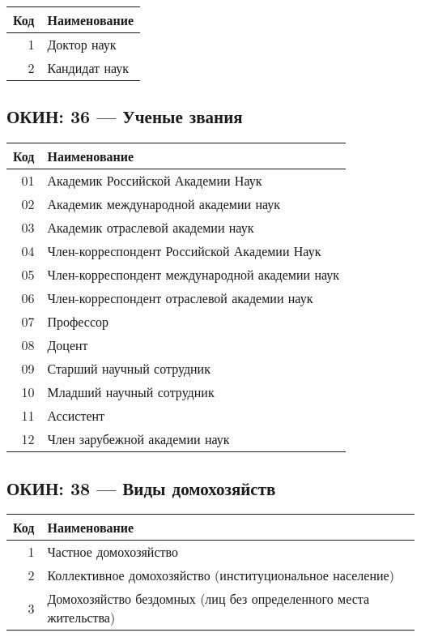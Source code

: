 \documentclass[10pt, a4paper, titlepage]{article}
\begin{document}
\begin{center}
    \begin{tabular}{rp{}}
        \hline
        \textbf{Код} & \textbf{Наименование} \\ \hline
        1 & Доктор наук \\
        2 & Кандидат наук \\
    \end{tabular}
\end{center}

\subsection{ОКИН: 36 --- Ученые звания}

\begin{center}
    \begin{tabular}{rp{}}
        \hline
        \textbf{Код} & \textbf{Наименование} \\ \hline
        01 & Академик Российской Академии Наук \\
        02 & Академик международной академии наук \\
        03 & Академик отраслевой академии наук \\
        04 & Член-корреспондент Российской Академии Наук \\
        05 & Член-корреспондент международной академии наук \\
        06 & Член-корреспондент отраслевой академии наук \\
        07 & Профессор \\
        08 & Доцент \\
        09 & Старший научный сотрудник \\
        10 & Младший научный сотрудник \\
        11 & Ассистент \\
        12 & Член зарубежной академии наук \\
    \end{tabular}
\end{center}

\subsection{ОКИН: 38 --- Виды домохозяйств}

\begin{center}
    \begin{tabular}{rp{}}
        \hline
        \textbf{Код} & \textbf{Наименование} \\ \hline
        1 & Частное домохозяйство \\
        2 & Коллективное домохозяйство (институциональное население) \\
        3 & Домохозяйство бездомных (лиц без определенного места жительства) \\
    \end{tabular}
\end{center}
\end{document}
